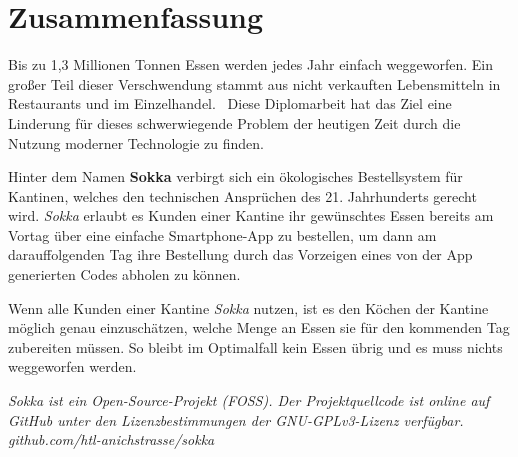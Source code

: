 \section*{Zusammenfassung}

Bis zu 1,3 Millionen Tonnen Essen werden jedes Jahr einfach weggeworfen. Ein großer Teil dieser Verschwendung stammt aus nicht verkauften Lebensmitteln in Restaurants und im Einzelhandel.~\cite{depta2018} Diese Diplomarbeit hat das Ziel eine Linderung für dieses schwerwiegende Problem der heutigen Zeit durch die Nutzung moderner Technologie zu finden.

Hinter dem Namen \textbf{Sokka} verbirgt sich ein ökologisches Bestellsystem für Kantinen, welches den technischen Ansprüchen des 21. Jahrhunderts gerecht wird. \textit{Sokka} erlaubt es Kunden einer Kantine ihr gewünschtes Essen bereits am Vortag über eine einfache Smartphone-App zu bestellen, um dann am darauffolgenden Tag ihre Bestellung durch das Vorzeigen eines von der App generierten Codes abholen zu können.

Wenn alle Kunden einer Kantine \textit{Sokka} nutzen, ist es den Köchen der Kantine möglich genau einzuschätzen, welche Menge an Essen sie für den kommenden Tag zubereiten müssen. So bleibt im Optimalfall kein Essen übrig und es muss nichts weggeworfen werden.

\textit{Sokka ist ein Open-Source-Projekt (FOSS). Der Projektquellcode ist online auf GitHub unter den Lizenzbestimmungen der GNU-GPLv3-Lizenz verfügbar.\\github.com/htl-anichstrasse/sokka}

\newpage
